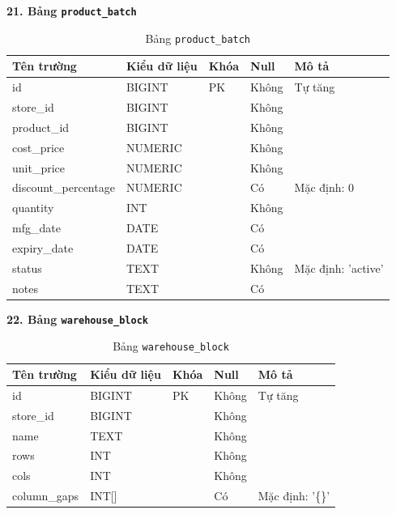 \documentclass[12pt,a4paper]{report}
\begin{document}
\textbf{21. Bảng \texttt{product\_batch}}
\vspace{0.1cm}
\begin{longtable}{|>{\ttfamily}p{3.5cm}|p{2.5cm}|p{1.5cm}|p{1.5cm}|p{5cm}|}
\caption{Bảng \texttt{product\_batch}} \label{tab:db_product_batch} \\
\hline
\normalfont\textbf{Tên trường} & \textbf{Kiểu dữ liệu} & \textbf{Khóa} & \textbf{Null} & \textbf{Mô tả} \\ \hline
id & BIGINT & PK & Không & Tự tăng \\ \hline
store\_id & BIGINT & & Không & \\ \hline
product\_id & BIGINT & & Không & \\ \hline
cost\_price & NUMERIC & & Không & \\ \hline
unit\_price & NUMERIC & & Không & \\ \hline
discount\_percentage & NUMERIC & & Có & Mặc định: 0 \\ \hline
quantity & INT & & Không & \\ \hline
mfg\_date & DATE & & Có & \\ \hline
expiry\_date & DATE & & Có & \\ \hline
status & TEXT & & Không & Mặc định: 'active' \\ \hline
notes & TEXT & & Có & \\ \hline
\end{longtable}

\vspace{0.3cm}
\textbf{22. Bảng \texttt{warehouse\_block}}
\vspace{0.1cm}
\begin{longtable}{|>{\ttfamily}p{3.5cm}|p{2.5cm}|p{1.5cm}|p{1.5cm}|p{5cm}|}
\caption{Bảng \texttt{warehouse\_block}} \label{tab:db_warehouse_block} \\
\hline
\normalfont\textbf{Tên trường} & \textbf{Kiểu dữ liệu} & \textbf{Khóa} & \textbf{Null} & \textbf{Mô tả} \\ \hline
id & BIGINT & PK & Không & Tự tăng \\ \hline
store\_id & BIGINT & & Không & \\ \hline
name & TEXT & & Không & \\ \hline
rows & INT & & Không & \\ \hline
cols & INT & & Không & \\ \hline
column\_gaps & INT[] & & Có & Mặc định: '\{\}' \\ \hline
\end{longtable}
\end{document}
